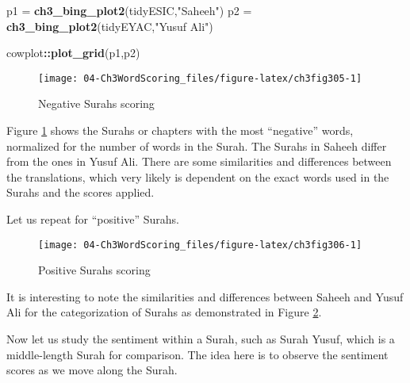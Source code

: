 \documentclass[
]{article}
\newenvironment{Shaded}{\begin{snugshade}}{\end{snugshade}}
\newcommand{\FunctionTok}[1]{\textcolor[rgb]{0.13,0.29,0.53}{\textbf{#1}}}
\newcommand{\NormalTok}[1]{#1}
\newcommand{\OtherTok}[1]{\textcolor[rgb]{0.56,0.35,0.01}{#1}}
\newcommand{\SpecialCharTok}[1]{\textcolor[rgb]{0.81,0.36,0.00}{\textbf{#1}}}
\newcommand{\StringTok}[1]{\textcolor[rgb]{0.31,0.60,0.02}{#1}}
\begin{document}
\begin{Shaded}
\begin{Highlighting}[]
\NormalTok{p1 }\OtherTok{=} \FunctionTok{ch3\_bing\_plot2}\NormalTok{(tidyESIC,}\StringTok{"Saheeh"}\NormalTok{)}
\NormalTok{p2 }\OtherTok{=} \FunctionTok{ch3\_bing\_plot2}\NormalTok{(tidyEYAC,}\StringTok{"Yusuf Ali"}\NormalTok{)}

\NormalTok{cowplot}\SpecialCharTok{::}\FunctionTok{plot\_grid}\NormalTok{(p1,p2)}
\end{Highlighting}
\end{Shaded}

\begin{figure}

{\centering \texttt{[image: 04-Ch3WordScoring\_files/figure-latex/ch3fig305-1]} 

}

\caption{Negative Surahs scoring}\label{fig:ch3fig305}
\end{figure}

Figure \ref{fig:ch3fig305} shows the Surahs or chapters with the most ``negative'' words, normalized for the number of words in the Surah. The Surahs in Saheeh differ from the ones in Yusuf Ali. There are some similarities and differences between the translations, which very likely is dependent on the exact words used in the Surahs and the scores applied.

Let us repeat for ``positive'' Surahs.

\begin{figure}

{\centering \texttt{[image: 04-Ch3WordScoring\_files/figure-latex/ch3fig306-1]} 

}

\caption{Positive Surahs scoring}\label{fig:ch3fig306}
\end{figure}

It is interesting to note the similarities and differences between Saheeh and Yusuf Ali for the categorization of Surahs as demonstrated in Figure \ref{fig:ch3fig306}.

Now let us study the sentiment within a Surah, such as Surah Yusuf, which is a middle-length Surah for comparison. The idea here is to observe the sentiment scores as we move along the Surah.
\end{document}
